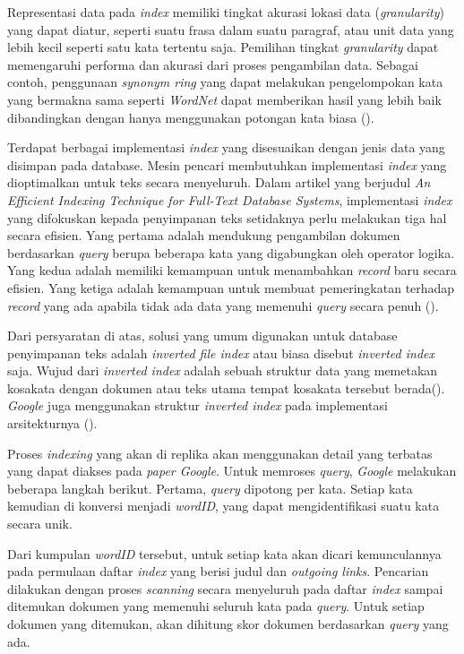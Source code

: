 Representasi data pada \emph{index} memiliki tingkat akurasi lokasi data
(\emph{granularity}) yang dapat diatur, seperti suatu frasa dalam suatu
paragraf, atau unit data yang lebih kecil seperti satu kata tertentu saja.
Pemilihan tingkat \emph{granularity} dapat memengaruhi performa dan akurasi
dari proses pengambilan data. Sebagai contoh, penggunaan \emph{synonym ring}
yang dapat melakukan pengelompokan kata yang bermakna sama seperti
\emph{WordNet} dapat memberikan hasil yang lebih baik dibandingkan dengan hanya
menggunakan potongan kata biasa (\cite{gonzalo1998wordnet}).

Terdapat berbagai implementasi \emph{index} yang disesuaikan dengan jenis data
yang disimpan pada database. Mesin pencari membutuhkan implementasi \emph{index}
yang dioptimalkan untuk teks secara menyeluruh. Dalam artikel yang berjudul
\emph{An Efficient Indexing Technique for Full-Text Database Systems}, 
implementasi \emph{index} yang difokuskan kepada penyimpanan teks setidaknya
perlu melakukan tiga hal secara efisien. Yang pertama adalah mendukung
pengambilan dokumen berdasarkan \emph{query} berupa beberapa kata yang
digabungkan oleh operator logika. Yang kedua adalah memiliki kemampuan untuk
menambahkan \emph{record} baru secara efisien. Yang ketiga adalah kemampuan
untuk membuat pemeringkatan terhadap \emph{record} yang ada apabila tidak ada
data yang memenuhi \emph{query} secara penuh (\cite{zobel1992efficient}).

Dari persyaratan di atas, solusi yang umum digunakan untuk database penyimpanan
teks adalah \emph{inverted file index} atau biasa disebut \emph{inverted index}
saja. Wujud dari \emph{inverted index} adalah sebuah struktur data yang 
memetakan kosakata dengan dokumen atau teks utama tempat kosakata tersebut
berada(\cite{hersh2001gigabytes}). \textit{Google} juga menggunakan struktur 
\textit{inverted index} pada implementasi arsitekturnya (\cite{brin1998google}).

Proses \emph{indexing} yang akan di replika akan menggunakan detail yang
terbatas yang dapat diakses pada \emph{paper Google}.  Untuk memroses
\emph{query}, \emph{Google} melakukan beberapa langkah berikut.  Pertama,
\emph{query} dipotong per kata. Setiap kata kemudian di konversi menjadi
\emph{wordID}, yang dapat mengidentifikasi suatu kata secara unik.

Dari kumpulan \emph{wordID} tersebut, untuk setiap kata akan dicari
kemunculannya pada permulaan daftar \emph{index} yang berisi judul dan
\emph{outgoing links}.  Pencarian dilakukan dengan proses \emph{scanning} secara
menyeluruh pada daftar \emph{index} sampai ditemukan dokumen yang memenuhi
seluruh kata pada \emph{query}. Untuk setiap dokumen yang ditemukan, akan
dihitung skor dokumen berdasarkan \emph{query} yang ada.

